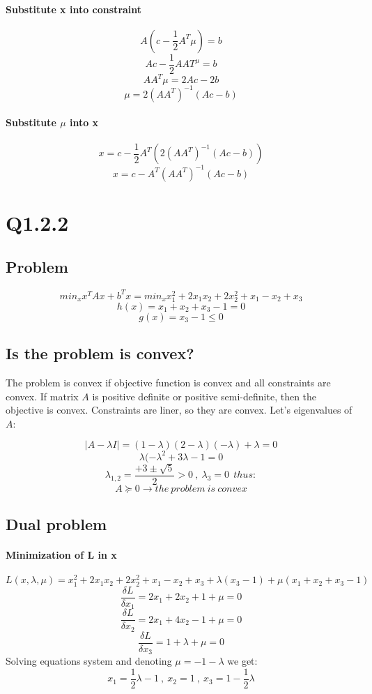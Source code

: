 \documentclass[12pt]{article}
\begin{document}
\paragraph{Substitute x into constraint}
\[A(c- \frac{1}{2} A^T \mu) = b\]
\[Ac - \frac{1}{2} AAT^ \mu = b\]
\[AA^T \mu = 2Ac - 2b\]
\[\mu = 2 (AA^T)^{-1} (Ac - b)\]
\paragraph{Substitute $\mu$ into x}
\[x = c - \frac{1}{2} A^T ( 2 ( AA^T )^{-1} ( Ac - b ) ) \] 
\[x = c -  A^T (AA^T)^{-1} (Ac - b)\]  

\newpage
\section{Q1.2.2}
\subsection{Problem}
\[min_x x^T A x + b^T x = min_x x_1 ^2 + 2 x_1 x_2 + 2 x_2 ^2 + x_1 - x_2 + x_3 \]
\[h(x)= x_1 + x_2 + x_3 - 1 = 0\]
\[g(x)= x_3 - 1 \leq 0 \]
\subsection{Is the problem is convex?}
The problem is convex if objective function is convex and all constraints are convex. If matrix $A$ is positive definite or positive semi-definite, then the objective is convex. Constraints are liner, so they are convex. Let's eigenvalues of $A$:

\[|A- \lambda I | = (1- \lambda)(2 -\lambda)(-\lambda)+ \lambda = 0 \]
\[\lambda (- \lambda ^2 + 3 \lambda - 1  = 0\]
\[\lambda_{1,2} = \frac{+3 \pm \sqrt{5}}{2} > 0 \ , \ \lambda_3 = 0 \ \ thus: \]
\[A \succeq 0 \longrightarrow the \ problem \ is \ convex \]

\subsection{Dual problem}
\paragraph{Minimization of L in x}
\[L(x, \lambda, \mu) = x_1 ^2 + 2 x_1 x_2 + 2 x_2 ^2 + x_1 - x_2 + x_3 + \lambda (x_3 - 1) + \mu (x_1 + x_2 + x_3 - 1)\]
\[\frac{\delta L}{\delta x_1} = 2x_1 + 2x_2 + 1 + \mu = 0 \]
\[\frac{\delta L}{\delta x_2} = 2x_1 + 4x_2 - 1 + \mu = 0 \]
\[\frac{\delta L}{\delta x_3} = 1 + \lambda + \mu = 0\]
Solving equations system and denoting $\mu = -1 -\lambda$ we get:
\[x_1 = \frac{1}{2} \lambda -1 \ , \ x_2 =1 \ , \ x_3 = 1 - \frac{1}{2} \lambda\]
\end{document}

